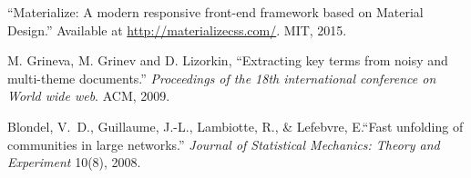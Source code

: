 \documentclass[11pt]{article}
\begin{document}

\begin{thebibliography}{99}

  ``Materialize: A modern responsive front-end framework based on Material Design.'' Available at \url{http://materializecss.com/}. MIT, 2015.

  M. Grineva, M. Grinev and D. Lizorkin, ``Extracting key terms from noisy and multi-theme documents.'' \emph{Proceedings of the 18th international conference on World wide web}. ACM, 2009.

 Blondel, V.~D., Guillaume, J.-L., Lambiotte, R., \& Lefebvre, E.``Fast unfolding of communities in large networks.'' \emph{Journal of Statistical Mechanics: Theory and Experiment} 10(8), 2008.

\end{thebibliography}
\end{document}
